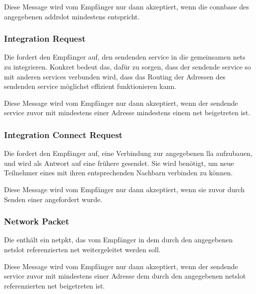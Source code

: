 Diese Message wird vom Empfänger nur dann akzeptiert, wenn die \gls{connbase} des angegebenen
\gls{addrslot} mindestens  entspricht.

\isprotonlnbytefield


\subsubsection{Integration Request}
\label{dcl-isproto-ireq}
Die \msg{\isprotoireq} fordert den Empfänger auf, den sendenden \gls{service} in die gemeinsamen
\glspl{net} zu integrieren. Konkret bedeut das, dafür zu sorgen, dass der sendende \gls{service}
so mit anderen \glspl{service} verbunden wird, dass das Routing der Adressen des sendenden
\gls{service} möglichst effizient funktionieren kann.

Diese Message wird vom Empfänger nur dann akzeptiert, wenn der sendende \gls{service} zuvor mit
mindestens einer Adresse mindestens einem \gls{net} beigetreten ist.

\isprotoireqbytefield


\subsubsection{Integration Connect Request}
\label{dcl-isproto-icreq}
Die \msg{\isprotoicreq} fordert den Empfänger auf, eine Verbindung zur angegebenen \gls{lla}
aufzubauen, und wird als Antwort auf eine frühere \msg{\isprotoireq} gesendet. Sie wird benötigt,
um neue Teilnehmer eines  mit ihren entsprechenden Nachbarn verbinden zu
können.

Diese Message wird vom Empfänger nur dann akzeptiert, wenn sie zuvor durch Senden einer
\msg{\isprotoireq} angefordert wurde.

\isprotoicreqbytefield


\subsubsection{Network Packet}
\label{dcl-isproto-np}
Die \msg{\isprotonp} enthält ein \gls{netpkt}, das vom Empfänger in dem durch den angegebenen
\gls{netslot} referenzierten \gls{net} weitergeleitet werden soll.

Diese Message wird vom Empfänger nur dann akzeptiert, wenn der sendende \gls{service} zuvor mit
mindestens einer Adresse dem durch den angegebenen \gls{netslot} referenzierten \gls{net}
beigetreten ist.

\isprotonpbytefield


